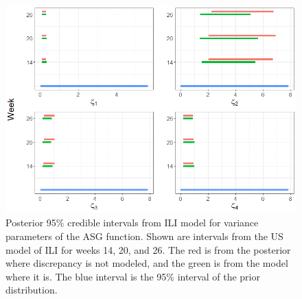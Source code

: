 \documentclass{article}
\begin{document}
\begin{figure}[hbt!]
    \centering
    \includegraphics[scale=.6]{Images/posterior_zeta.png}
    \caption{Posterior 95\% credible intervals from ILI model for variance parameters of the ASG function. Shown are intervals from the US model of ILI for weeks 14, 20, and 26. The red is from the posterior where discrepancy is not modeled, and the green is from the model where it is. The blue interval is the 95\% interval of the prior distribution.}
    \label{fig:posterior_zeta}
\end{figure}
\end{document}
